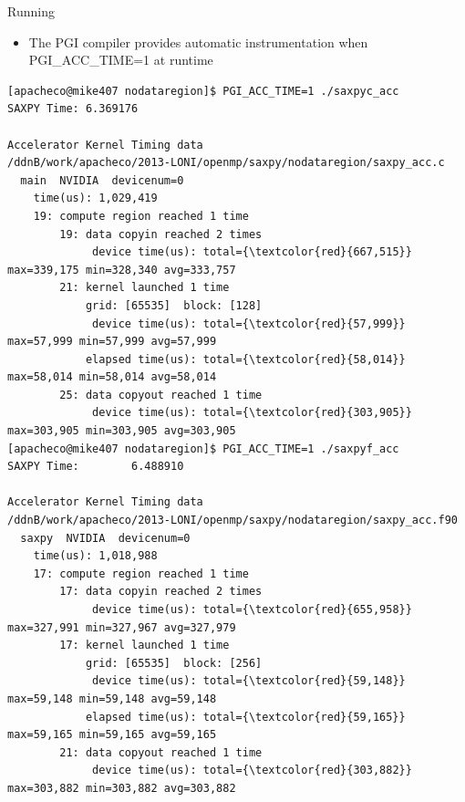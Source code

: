 \documentclass[c,mathserif,compress,xcolor=svgnames]{beamer}
\newenvironment{bblock}[0]
{
\begin{beamerboxesrounded}[upper=uppercol1,lower=lowercol1,shadow=true]}
{\end{beamerboxesrounded}}
\begin{document}
\begin{frame}[fragile]{\small Running}
  \begin{itemize}
    \item The PGI compiler provides automatic instrumentation when {\color{orange}PGI\_ACC\_TIME=1} at runtime
  \end{itemize}
  \begin{bblock}{}
    \begin{Verbatim}[fontsize=\fontsize{5}{6}\selectfont,commandchars=\\\{\}]
[apacheco@mike407 nodataregion]$ PGI_ACC_TIME=1 ./saxpyc_acc
SAXPY Time: 6.369176

Accelerator Kernel Timing data
/ddnB/work/apacheco/2013-LONI/openmp/saxpy/nodataregion/saxpy_acc.c
  main  NVIDIA  devicenum=0
    time(us): 1,029,419
    19: compute region reached 1 time
        19: data copyin reached 2 times
             device time(us): total={\textcolor{red}{667,515}} max=339,175 min=328,340 avg=333,757
        21: kernel launched 1 time
            grid: [65535]  block: [128]
             device time(us): total={\textcolor{red}{57,999}} max=57,999 min=57,999 avg=57,999
            elapsed time(us): total={\textcolor{red}{58,014}} max=58,014 min=58,014 avg=58,014
        25: data copyout reached 1 time
             device time(us): total={\textcolor{red}{303,905}} max=303,905 min=303,905 avg=303,905
[apacheco@mike407 nodataregion]$ PGI_ACC_TIME=1 ./saxpyf_acc
SAXPY Time:        6.488910

Accelerator Kernel Timing data
/ddnB/work/apacheco/2013-LONI/openmp/saxpy/nodataregion/saxpy_acc.f90
  saxpy  NVIDIA  devicenum=0
    time(us): 1,018,988
    17: compute region reached 1 time
        17: data copyin reached 2 times
             device time(us): total={\textcolor{red}{655,958}} max=327,991 min=327,967 avg=327,979
        17: kernel launched 1 time
            grid: [65535]  block: [256]
             device time(us): total={\textcolor{red}{59,148}} max=59,148 min=59,148 avg=59,148
            elapsed time(us): total={\textcolor{red}{59,165}} max=59,165 min=59,165 avg=59,165
        21: data copyout reached 1 time
             device time(us): total={\textcolor{red}{303,882}} max=303,882 min=303,882 avg=303,882
    \end{Verbatim}
  \end{bblock}
\end{frame}
\end{document}

